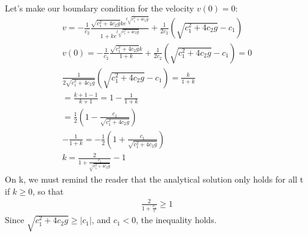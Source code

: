 \documentclass[english,a4paper,oneside,article,9pt]{memoir}
\begin{document}
Let's make our boundary condition for the velocity $v(0)=0$:
\begin{align*}
v=-\frac{1}{c_2}\frac{\sqrt{c_1^2+4c_2g}ke^{t\sqrt{c_1^2+4c_2g}}}{1+ke^{t\sqrt{c_1^2+4c_2g}}}+\frac{1}{2c_2}(\sqrt{c_1^2+4c_2g}-c_1)\\
v(0)=-\frac{1}{c_2}\frac{\sqrt{c_1^2+4c_2g}k}{1+k}+\frac{1}{2c_2}(\sqrt{c_1^2+4c_2g}-c_1)=0\\
\frac{1}{2\sqrt{c_1^2+4c_2g}}(\sqrt{c_1^2+4c_2g}-c_1)=\frac{k}{1+k}\\
=\frac{k+1-1}{k+1}=1-\frac{1}{1+k}\\
=\frac{1}{2}(1-\frac{c_1}{\sqrt{c_1^2+4c_2g}})\\
-\frac{1}{1+k}=-\frac{1}{2}(1+\frac{c_1}{\sqrt{c_1^2+4c_2g}})\\
k=\frac{2}{1+\frac{c_1}{\sqrt{c_1^2+4c_2g}}}-1
\end{align*}
On k, we must remind the reader that the analytical solution only holds for all t if $k\geq0$, so that
\begin{align*}
\frac{2}{1+\frac{c_1}{c}}\geq 1
\end{align*}
Since $\sqrt{c_1^2+4c_2g}\geq|c_1|$, and $c_1<0$, the inequality holds.\\
\end{document}
